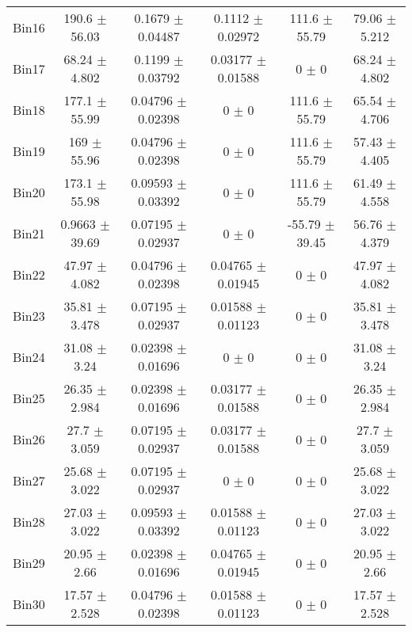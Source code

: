 \begin{tabular}{@{\extracolsep{4pt}}lccccc@{}}
     Bin16 & 190.6 $\pm$ 56.03 & 0.1679 $\pm$ 0.04487 & 0.1112 $\pm$ 0.02972 & 111.6 $\pm$ 55.79 & 79.06 $\pm$ 5.212 \\ 
     Bin17 & 68.24 $\pm$ 4.802 & 0.1199 $\pm$ 0.03792 & 0.03177 $\pm$ 0.01588 & 0 $\pm$ 0 & 68.24 $\pm$ 4.802 \\ 
     Bin18 & 177.1 $\pm$ 55.99 & 0.04796 $\pm$ 0.02398 & 0 $\pm$ 0 & 111.6 $\pm$ 55.79 & 65.54 $\pm$ 4.706 \\ 
     Bin19 & 169 $\pm$ 55.96 & 0.04796 $\pm$ 0.02398 & 0 $\pm$ 0 & 111.6 $\pm$ 55.79 & 57.43 $\pm$ 4.405 \\ 
     Bin20 & 173.1 $\pm$ 55.98 & 0.09593 $\pm$ 0.03392 & 0 $\pm$ 0 & 111.6 $\pm$ 55.79 & 61.49 $\pm$ 4.558 \\ 
     Bin21 & 0.9663 $\pm$ 39.69 & 0.07195 $\pm$ 0.02937 & 0 $\pm$ 0 & -55.79 $\pm$ 39.45 & 56.76 $\pm$ 4.379 \\ 
     Bin22 & 47.97 $\pm$ 4.082 & 0.04796 $\pm$ 0.02398 & 0.04765 $\pm$ 0.01945 & 0 $\pm$ 0 & 47.97 $\pm$ 4.082 \\ 
     Bin23 & 35.81 $\pm$ 3.478 & 0.07195 $\pm$ 0.02937 & 0.01588 $\pm$ 0.01123 & 0 $\pm$ 0 & 35.81 $\pm$ 3.478 \\ 
     Bin24 & 31.08 $\pm$ 3.24 & 0.02398 $\pm$ 0.01696 & 0 $\pm$ 0 & 0 $\pm$ 0 & 31.08 $\pm$ 3.24 \\ 
     Bin25 & 26.35 $\pm$ 2.984 & 0.02398 $\pm$ 0.01696 & 0.03177 $\pm$ 0.01588 & 0 $\pm$ 0 & 26.35 $\pm$ 2.984 \\ 
     Bin26 & 27.7 $\pm$ 3.059 & 0.07195 $\pm$ 0.02937 & 0.03177 $\pm$ 0.01588 & 0 $\pm$ 0 & 27.7 $\pm$ 3.059 \\ 
     Bin27 & 25.68 $\pm$ 3.022 & 0.07195 $\pm$ 0.02937 & 0 $\pm$ 0 & 0 $\pm$ 0 & 25.68 $\pm$ 3.022 \\ 
     Bin28 & 27.03 $\pm$ 3.022 & 0.09593 $\pm$ 0.03392 & 0.01588 $\pm$ 0.01123 & 0 $\pm$ 0 & 27.03 $\pm$ 3.022 \\ 
     Bin29 & 20.95 $\pm$ 2.66 & 0.02398 $\pm$ 0.01696 & 0.04765 $\pm$ 0.01945 & 0 $\pm$ 0 & 20.95 $\pm$ 2.66 \\ 
     Bin30 & 17.57 $\pm$ 2.528 & 0.04796 $\pm$ 0.02398 & 0.01588 $\pm$ 0.01123 & 0 $\pm$ 0 & 17.57 $\pm$ 2.528 \\ 
\hline\hline
  \end{tabular}
